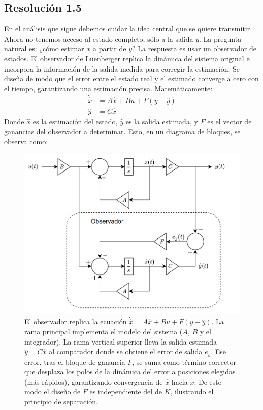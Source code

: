 \documentclass[
  11pt,
  letterpaper,
   addpoints,
   answers
  ]{exam}
\begin{document}
\begin{questions}
\begin{solution}
  \subsection*{Resolución 1.5}
  En el análisis que sigue debemos cuidar la idea central que se quiere transmitir. Ahora no tenemos acceso al estado completo, sólo a la salida $y$. La pregunta natural es: ¿cómo estimar $x$ a partir de $y$? La respuesta es usar un observador de estados. El observador de Luenberger replica la dinámica del sistema original e incorpora la información de la salida medida para corregir la estimación. Se diseña de modo que el error entre el estado real y el estimado converge a cero con el tiempo, garantizando una estimación precisa. Matemáticamente:
  \begin{align}
    \dot{\hat x} &= A\hat x + Bu + F(y - \hat y) \\
    \hat y &= C\hat x
  \end{align}
  Donde $\hat x$ es la estimación del estado, $\hat y$ es la salida estimada, y $F$ es el vector de ganancias del observador a determinar. Esto, en un diagrama de bloques, se observa como:
    \begin{figure}[H]\centering
    \includegraphics[width=.9\textwidth]{../figures/Auxiliar_4_3.png}
    \caption{El observador replica la ecuación $\dot{\hat x}=A\hat x + Bu + F(y-\hat y)$. La rama principal implementa el modelo del sistema ($A$, $B$ y el integrador). La rama vertical superior lleva la salida estimada $\hat y = C\hat x$ al comparador donde se obtiene el error de salida $e_y$. Ese error, tras el bloque de ganancia $F$, se suma como término corrector que desplaza los polos de la dinámica del error a posiciones elegidas (más rápidos), garantizando convergencia de $\hat x$ hacia $x$. De este modo el diseño de $F$ es independiente del de $K$, ilustrando el principio de separación.}

\end{figure}
\end{solution}
\end{questions}
\end{document}
